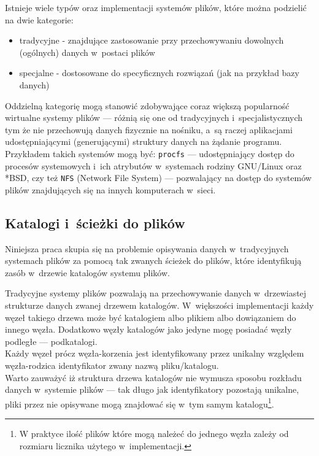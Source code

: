 \par
Istnieje wiele typów oraz implementacji systemów plików, które można podzielić na dwie kategorie:

\begin{itemize}
\item tradycyjne - znajdujące zastosowanie przy przechowywaniu dowolnych (ogólnych) danych w~postaci plików
\item specjalne - dostosowane do specyficznych rozwiązań (jak na przykład bazy danych)
\end{itemize}

Oddzielną kategorię mogą stanowić zdobywające coraz większą popularność wirtualne systemy plików --- różnią się one od tradycyjnych i~specjalistycznych tym że nie przechowują danych fizycznie na nośniku, a~są raczej aplikacjami udostępniającymi (generującymi) struktury danych na żądanie programu. Przykładem takich systemów mogą być: \texttt{procfs} --- udostępniający dostęp do procesów systemowych i~ich atrybutów w~systemach rodziny GNU/Linux oraz *BSD, czy też \texttt{NFS} (Network File System) --- pozwalający na dostęp do systemów plików znajdujących się na innych komputerach w~sieci\cite{website:filesystems-howto}.

\subsection{Katalogi i~ścieżki do plików}
\par
Niniejsza praca skupia się na problemie opisywania danych w~tradycyjnych systemach plików za pomocą tak zwanych ścieżek do plików, które identyfikują zasób w~drzewie katalogów systemu plików\cite{wiki:path}.

\par
Tradycyjne systemy plików pozwalają na przechowywanie danych w~drzewiastej strukturze danych zwanej drzewem katalogów. W~większości implementacji każdy węzeł takiego drzewa może być katalogiem albo plikiem albo dowiązaniem do innego węzła. Dodatkowo węzły katalogów jako jedyne mogę posiadać węzły podległe --- podkatalogi\cite{website:filesystems-howto}.\\
Każdy węzeł prócz węzła-korzenia jest identyfikowany przez unikalny względem węzła-rodzica identyfikator zwany nazwą pliku/katalogu.\\
Warto zauważyć iż struktura drzewa katalogów nie wymusza sposobu rozkładu danych w~systemie plików --- tak długo jak identyfikatory pozostają unikalne, pliki przez nie opisywane mogą znajdować się w~tym samym katalogu\footnote{W praktyce ilość plików które mogą należeć do jednego węzła zależy od rozmiaru licznika użytego w~implementacji.}.

